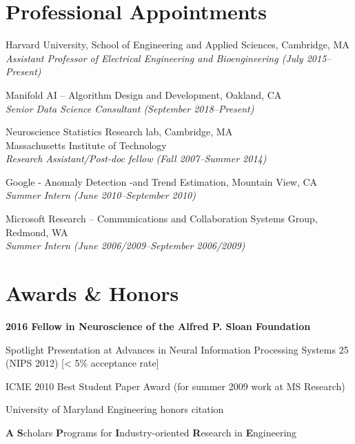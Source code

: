 \documentclass[12pt,letterpaper]{article}
\renewenvironment{itemize}{
  \begin{list}{}{
    \setlength{\leftmargin}{1.5em}
    \setlength{\itemsep}{0.25em}
    \setlength{\parskip}{0pt}
    \setlength{\parsep}{0.25em}
  }
}{
  \end{list}
}
\begin{document}
\section*{Professional Appointments}

\begin{itemize}
    \item Harvard University, School of Engineering and Applied Sciences, Cambridge, MA\\
          \emph{Assistant Professor of Electrical Engineering and Bioengineering (July 2015--Present)}
          
    \item Manifold AI -- Algorithm Design and Development, Oakland, CA\\
          \emph{Senior Data Science Consultant (September 2018--Present)}
          
    \item Neuroscience Statistics Research lab, Cambridge, MA\\
          Massachusetts Institute of Technology \\
          \emph{Research Assistant/Post-doc fellow (Fall 2007--Summer 2014)}

    \item Google - Anomaly Detection -and Trend Estimation, Mountain View, CA\\
          \emph{Summer Intern (June 2010--September 2010)}

    \item Microsoft Research -- Communications and Collaboration Systems Group, Redmond, WA\\
          \emph{Summer Intern (June 2006/2009--September 2006/2009)}
\end{itemize}

\section*{Awards \& Honors}

\begin{itemize}
	\item \textbf{2016 Fellow in Neuroscience of the Alfred P. Sloan Foundation}
    \item Spotlight Presentation at Advances in Neural Information Processing Systems 25 (NIPS 2012) [< 5\% acceptance rate]
    \item ICME 2010 Best Student Paper Award (for summer 2009 work at MS Research)
    \item University of Maryland Engineering honors citation
    \item \textbf{A} \textbf{S}cholars \textbf{P}rograms for \textbf{I}ndustry-oriented \textbf{R}esearch in \textbf{E}ngineering
\end{itemize}
\end{document}
